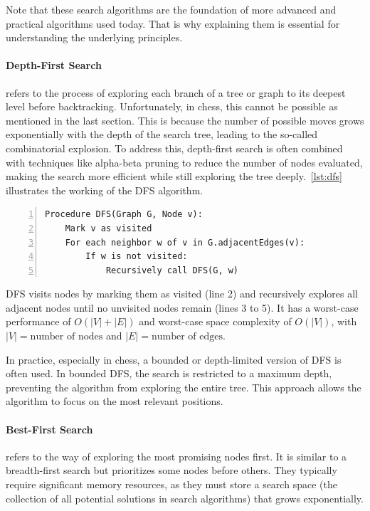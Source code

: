 \noindent Note that these search algorithms are the foundation of more advanced and practical algorithms used today. That is why explaining them is essential for understanding the underlying principles.

\paragraph{Depth-First Search} refers to the process of exploring each branch of a tree or graph to its deepest level before backtracking. Unfortunately, in chess, this cannot be possible as mentioned in the last section. This is because the number of possible moves grows exponentially with the depth of the search tree, leading to the so-called combinatorial explosion. To address this, depth-first search is often combined with techniques like alpha-beta pruning to reduce the number of nodes evaluated, making the search more efficient while still exploring the tree deeply.~\cref{lst:dfs} illustrates the working of the DFS algorithm.

\vspace{1em}

\begin{lstlisting}[caption={Pseudocode of the Depth-First Search algorithm~\cite{CLRS}.}, label={lst:dfs}, frame=single, numbers=left, xleftmargin=15pt]
Procedure DFS(Graph G, Node v):
    Mark v as visited
    For each neighbor w of v in G.adjacentEdges(v):
        If w is not visited:
            Recursively call DFS(G, w)
\end{lstlisting}

\vspace{1em}

\noindent DFS visits nodes by marking them as visited (line 2) and recursively explores all adjacent nodes until no unvisited nodes remain (lines 3 to 5). It has a worst-case performance of $O(|V| + |E|)$ and worst-case space complexity of $O(|V|)$, with $|V| = \text{number of nodes}$ and $|E| = \text{number of edges}$.

\vspace{1em}

\noindent In practice, especially in chess, a bounded or depth-limited version of DFS is often used. In bounded DFS, the search is restricted to a maximum depth, preventing the algorithm from exploring the entire tree. This approach allows the algorithm to focus on the most relevant positions.

\paragraph{Best-First Search} refers to the way of exploring the most promising nodes first. It is similar to a breadth-first search but prioritizes some nodes before others. They typically require significant memory resources, as they must store a search space (the collection of all potential solutions in search algorithms) that grows exponentially.

